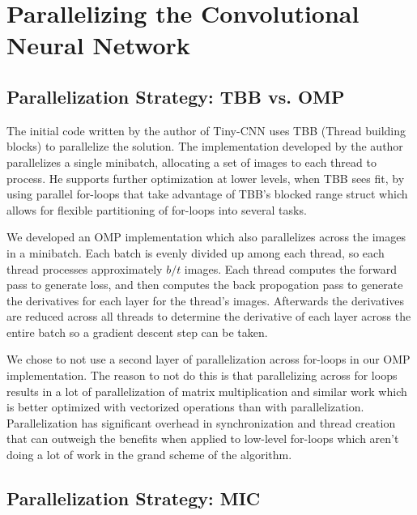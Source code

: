 
\section{Parallelizing the Convolutional Neural Network}
\label{sec-parallelizing}

\subsection{Parallelization Strategy: TBB vs. OMP}
\label{sec-parallelizing-tbbvomp}

The initial code written by the author of Tiny-CNN uses TBB (Thread building blocks) to parallelize the solution. The implementation developed by the author parallelizes a single minibatch, allocating a set of images to each thread to process. He supports further optimization at lower levels, when TBB sees fit, by using parallel for-loops that take advantage of TBB's blocked range struct which allows for flexible partitioning of for-loops into several tasks.

We developed an OMP implementation which also parallelizes across the images in a minibatch. Each batch is evenly divided up among each thread, so each thread processes approximately $b/t$ images. Each thread computes the forward pass to generate loss, and then computes the back propogation pass to generate the derivatives for each layer for the thread's images. Afterwards the derivatives are reduced across all threads to determine the derivative of each layer across the entire batch so a gradient descent step can be taken.

We chose to not use a second layer of parallelization across for-loops in our OMP implementation. The reason to not do this is that parallelizing across for loops results in a lot of parallelization of matrix multiplication and similar work which is better optimized with vectorized operations than with parallelization. Parallelization has significant overhead in synchronization and thread creation that can outweigh the benefits when applied to low-level for-loops which aren't doing a lot of work in the grand scheme of the algorithm.
%

\subsection{Parallelization Strategy: MIC}
\label{sec-parallelizing-offload}

